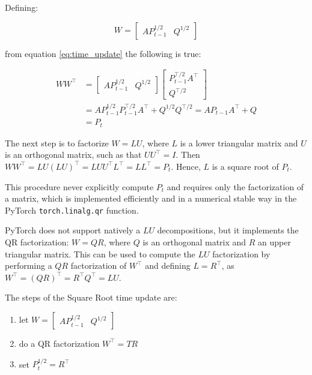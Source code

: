 \documentclass{article}
\begin{document}
Defining:

\begin{equation*}
    W = \begin{bmatrix}AP_{t-1}^{1/2} & Q^{1/2}\end{bmatrix}
\end{equation*}

from equation \ref{eq:time_update} the following is true:


\begin{align*}
  WW^\top &=  \begin{bmatrix}AP_{t-1}^{1/2} & Q^{1/2}\end{bmatrix}\begin{bmatrix}P_{t-1}^{\top/2}A^\top \\ Q^{\top/2}\end{bmatrix}
  \\ &= AP_{t-1}^{1/2}P_{t-1}^{\top/2}A^\top + Q^{1/2}Q^{\top/2} = AP_{t-1}A^\top + Q\\ &= P_t
\end{align*}

The next step is to factorize  $W=LU$, where $L$ is a lower triangular matrix and $U$ is an orthogonal matrix, such as that $UU^\top = I$. Then $WW^\top = LU(LU)^\top = LUU^\top L^\top = LL^\top=P_t$. Hence, $L$ is a square root of $P_t$.

This procedure never explicitly compute $P_t$ and requires only the factorization of a matrix, which is implemented efficiently and in a numerical stable way in the \textsf{PyTorch} \verb|torch.linalg.qr| function. 

PyTorch does not support natively a $LU$ decompositions, but it implements the QR factorization: $W=QR$, where $Q$ is an orthogonal matrix and $R$ an upper triangular matrix. This can be used to compute the $LU$ factorization by performing a $QR$ factorization of $W^\top$ and defining $L = R^\top$, as $W^\top=(QR)^\top=R^\top Q^\top=LU$.

The steps of the Square Root time update are:

\begin{enumerate}
    \item let  $W = \begin{bmatrix}AP_{t-1}^{1/2} & Q^{1/2}\end{bmatrix}$
    \item do a QR factorization $W^\top=TR$
    \item set $P_t^{1/2} = R^\top$
\end{enumerate}
\end{document}
